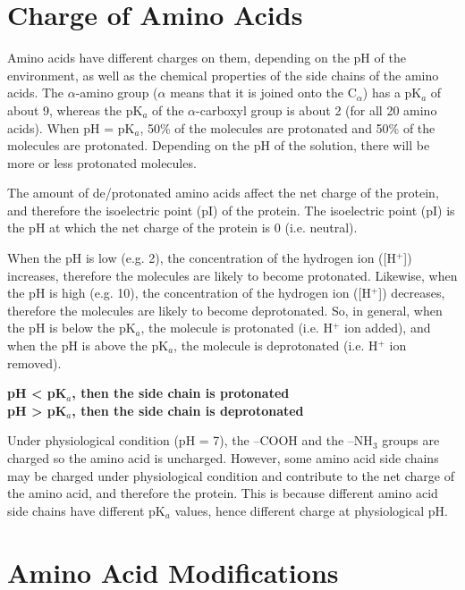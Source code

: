 \section{Charge of Amino Acids}

Amino acids have different charges on them, depending on the pH of the environment, as well as the chemical properties of the side chains of the amino acids.
The $\alpha$-amino group ($\alpha$ means that it is joined onto the C$_{\alpha}$) has a pK$_a$ of about 9, whereas the pK$_a$ of the $\alpha$-carboxyl group is about 2 (for all 20 amino acids).
When pH = pK$_a$, 50\% of the molecules are protonated and 50\% of the molecules are protonated.
Depending on the pH of the solution, there will be more or less protonated molecules.

The amount of de/protonated amino acids affect the net charge of the protein, and therefore the isoelectric point (pI) of the protein.
The isoelectric point (pI) is the pH at which the net charge of the protein is 0 (i.e. neutral).

When the pH is low (e.g. 2), the concentration of the hydrogen ion ([H$^+$]) increases, therefore the molecules are likely to become protonated.
Likewise, when the pH is high (e.g. 10), the concentration of the hydrogen ion ([H$^+$]) decreases, therefore the molecules are likely to become deprotonated.
So, in general, when the pH is below the pK$_a$, the molecule is protonated (i.e. H$^+$ ion added), and when the pH is above the pK$_a$, the molecule is deprotonated (i.e. H$^+$ ion removed).

\begin{center}
    \textbf
        {pH \textless{} pK$_a$, then the side chain is protonated \\
        pH \textgreater{} pK$_a$, then the side chain is deprotonated}
\end{center}

Under physiological condition (pH = 7), the --COOH and the --NH$_3$ groups are charged so the amino acid is uncharged.
However, some amino acid side chains may be charged under physiological condition and contribute to the net charge of the amino acid, and therefore the protein.
This is because different amino acid side chains have different pK$_a$ values, hence different charge at physiological pH.

\section{Amino Acid Modifications}

